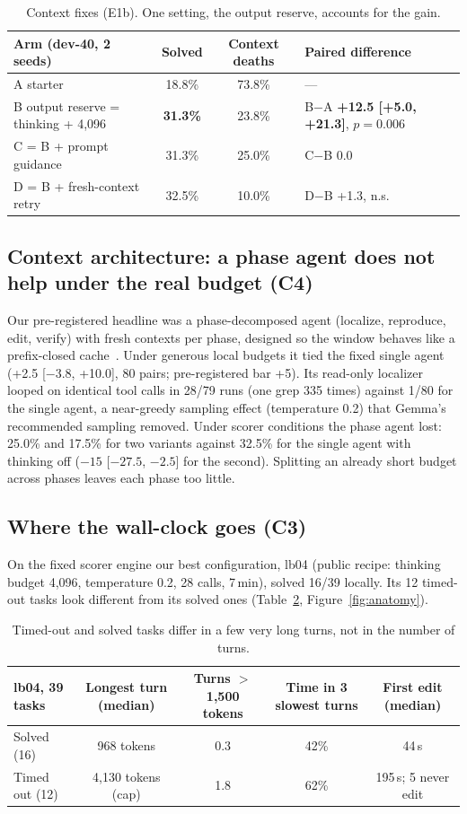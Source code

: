 \documentclass[11pt]{article}
\begin{document}
\begin{table}[!htb]
\centering\footnotesize
\begin{tabular}{lccl}
\toprule
Arm (dev-40, 2 seeds) & Solved & Context deaths & Paired difference \\
\midrule
A starter & 18.8\% & 73.8\% & --- \\
B output reserve = thinking + 4,096 & \textbf{31.3\%} & 23.8\% & B$-$A \textbf{+12.5 [+5.0, +21.3]}, $p = 0.006$ \\
C = B + prompt guidance & 31.3\% & 25.0\% & C$-$B 0.0 \\
D = B + fresh-context retry & 32.5\% & 10.0\% & D$-$B +1.3, n.s. \\
\bottomrule
\end{tabular}
\caption{Context fixes (E1b). One setting, the output reserve, accounts for the gain.}
\label{tab:e1b}
\end{table}

\subsection{Context architecture: a phase agent does not help under the real budget (C4)}
Our pre-registered headline was a phase-decomposed agent (localize, reproduce, edit, verify) with fresh contexts per phase, designed so the window behaves like a prefix-closed cache~\citep{belady1966}. Under generous local budgets it tied the fixed single agent (+2.5 [$-3.8$, +10.0], 80 pairs; pre-registered bar +5). Its read-only localizer looped on identical tool calls in 28/79 runs (one grep 335 times) against 1/80 for the single agent, a near-greedy sampling effect (temperature 0.2) that Gemma's recommended sampling removed. Under scorer conditions the phase agent lost: 25.0\% and 17.5\% for two variants against 32.5\% for the single agent with thinking off ($-15$ [$-27.5$, $-2.5$] for the second). Splitting an already short budget across phases leaves each phase too little.

\subsection{Where the wall-clock goes (C3)}
On the fixed scorer engine our best configuration, lb04 (public recipe: thinking budget 4,096, temperature 0.2, 28 calls, 7\,min), solved 16/39 locally. Its 12 timed-out tasks look different from its solved ones (Table~\ref{tab:anatomy}, Figure~\ref{fig:anatomy}).

\begin{table}[!htb]
\centering\footnotesize
\begin{tabular}{lcccc}
\toprule
lb04, 39 tasks & Longest turn (median) & Turns $>$1,500 tokens & Time in 3 slowest turns & First edit (median) \\
\midrule
Solved (16) & 968 tokens & 0.3 & 42\% & 44\,s \\
Timed out (12) & 4,130 tokens (cap) & 1.8 & 62\% & 195\,s; 5 never edit \\
\bottomrule
\end{tabular}
\caption{Timed-out and solved tasks differ in a few very long turns, not in the number of turns.}
\label{tab:anatomy}
\end{table}
\end{document}
